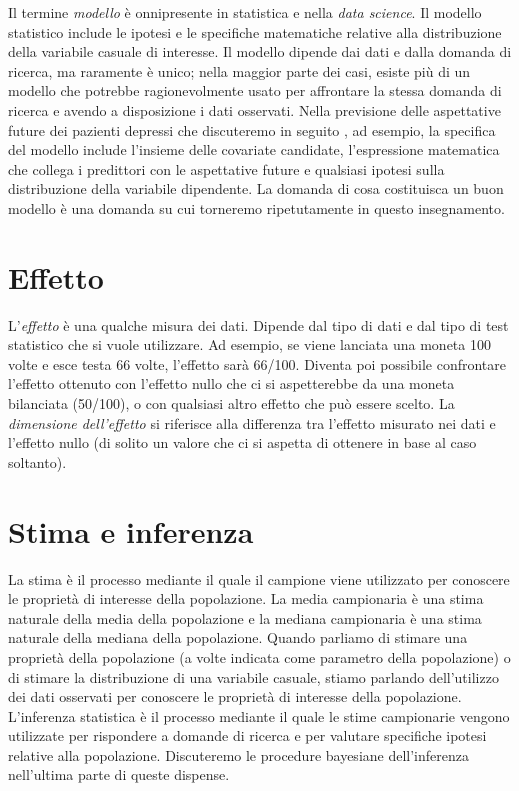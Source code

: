 \documentclass[
]{book}
\theoremstyle{definition}
\theoremstyle{definition}
\theoremstyle{definition}
\theoremstyle{definition}
\theoremstyle{remark}
\begin{document}
Il termine \emph{modello} è onnipresente in statistica e nella \emph{data science}. Il modello statistico include le ipotesi e le specifiche matematiche relative alla distribuzione della variabile casuale di interesse. Il modello dipende dai dati e dalla domanda di ricerca, ma raramente è unico; nella maggior parte dei casi, esiste più di un modello che potrebbe ragionevolmente usato per affrontare la stessa domanda di ricerca e avendo a disposizione i dati osservati. Nella previsione delle aspettative future dei pazienti depressi che discuteremo in seguito \citep{zetschefuture2019}, ad esempio, la specifica del modello include l'insieme delle covariate candidate, l'espressione matematica che collega i predittori con le aspettative future e qualsiasi ipotesi sulla distribuzione della variabile dipendente. La domanda di cosa costituisca un buon modello è una domanda su cui torneremo ripetutamente in questo insegnamento.

\hypertarget{effetto}{%
\section{Effetto}\label{effetto}}

L'\emph{effetto} è una qualche misura dei dati. Dipende dal tipo di dati e dal tipo di test statistico che si vuole utilizzare. Ad esempio, se viene lanciata una moneta 100 volte e esce testa 66 volte, l'effetto sarà 66/100. Diventa poi possibile confrontare l'effetto ottenuto con l'effetto nullo che ci si aspetterebbe da una moneta bilanciata (50/100), o con qualsiasi altro effetto che può essere scelto. La \emph{dimensione dell'effetto} si riferisce alla differenza tra l'effetto misurato nei dati e l'effetto nullo (di solito un valore che ci si aspetta di ottenere in base al caso soltanto).

\hypertarget{stima-e-inferenza}{%
\section{Stima e inferenza}\label{stima-e-inferenza}}

La stima è il processo mediante il quale il campione viene utilizzato per conoscere le proprietà di interesse della popolazione. La media campionaria è una stima naturale della media della popolazione e la mediana campionaria è una stima naturale della mediana della popolazione. Quando parliamo di stimare una proprietà della popolazione (a volte indicata come parametro della popolazione) o di stimare la distribuzione di una variabile casuale, stiamo parlando dell'utilizzo dei dati osservati per conoscere le proprietà di interesse della popolazione. L'inferenza statistica è il processo mediante il quale le stime campionarie vengono utilizzate per rispondere a domande di ricerca e per valutare specifiche ipotesi relative alla popolazione. Discuteremo le procedure bayesiane dell'inferenza nell'ultima parte di queste dispense.
\end{document}
